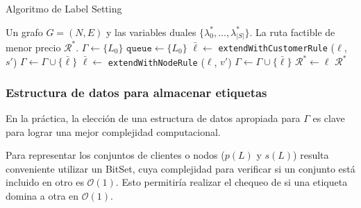 \begin{algorithm}[H]
  \caption{Algoritmo de Label Setting}
  \label{al:label-setting}
  \begin{algorithmic}[1]
  	\Require Un grafo $G = (N, E)$ y las variables duales $\{\lambda^*_0, \dots, \lambda^*_{|S|}\}$.
  	\Ensure La ruta factible de menor precio $\mathscr{R}^{*}$.
        \State $\Gamma \gets \{L_0\}$
        \State $\texttt{queue} \gets \{L_0\}$
                    \State $\bar{\ell} \gets $ \texttt{extendWithCustomerRule} ($\ell$, $s'$)
                        \State $\Gamma \gets \Gamma \cup \{\bar{\ell}\}$
                    \EndIf
                \EndFor
                    \State $\bar{\ell} \gets $ \texttt{extendWithNodeRule} ($\ell$, $v'$)
                        \State $\Gamma \gets \Gamma \cup \{\bar{\ell}\}$
                    \EndIf
                \EndFor
            \EndIf
        \EndWhile
                \State $\mathscr{R}^{*} \gets \ell$
            \EndIf
        \EndFor
        \Return $\mathscr{R}^{*}$
  \end{algorithmic}
\end{algorithm}


\subsubsection{Estructura de datos para almacenar etiquetas}

En la práctica, la elección de una estructura de datos apropiada para $\Gamma$ es clave para lograr una mejor complejidad computacional.

Para representar los conjuntos de clientes o nodos ($p(L)$ y $s(L)$) resulta conveniente utilizar un BitSet, cuya complejidad para verificar si un conjunto está incluido en otro es $\mathcal{O}(1)$. Esto permitiría realizar el chequeo de si una etiqueta domina a otra en $\mathcal{O}(1)$. 

